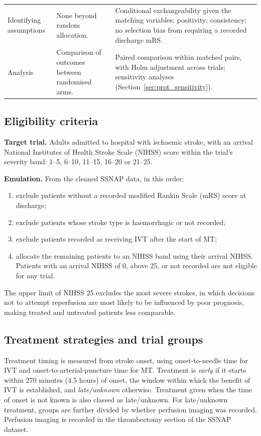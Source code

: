 \begin{table}[H]
\begin{tabular}{p{2.8cm} p{6.6cm} p{6.6cm}}
\addlinespace
Identifying assumptions & None beyond random allocation. & Conditional exchangeability given the matching variables; positivity; consistency; no selection bias from requiring a recorded discharge mRS. \\
\addlinespace
Analysis & Comparison of outcomes between randomised arms. & Paired comparison within matched pairs, with Holm adjustment across trials; sensitivity analyses (Section~\ref{sec:prot_sensitivity}). \\
\bottomrule
\end{tabular}
\end{table}

\subsection{Eligibility criteria}

\textbf{Target trial.} Adults admitted to hospital with ischaemic stroke, with an arrival National Institutes of Health Stroke Scale (NIHSS)\cite{brott_measurements_1989} score within the trial's severity band: 1--5, 6--10, 11--15, 16--20 or 21--25.

\textbf{Emulation.} From the cleaned SSNAP data, in this order:
\begin{enumerate}
\item exclude patients without a recorded modified Rankin Scale (mRS) score at discharge;
\item exclude patients whose stroke type is haemorrhagic or not recorded;
\item exclude patients recorded as receiving IVT after the start of MT;
\item allocate the remaining patients to an NIHSS band using their arrival NIHSS. Patients with an arrival NIHSS of 0, above 25, or not recorded are not eligible for any trial.
\end{enumerate}
The upper limit of NIHSS 25 excludes the most severe strokes, in which decisions not to attempt reperfusion are most likely to be influenced by poor prognosis, making treated and untreated patients less comparable.

\subsection{Treatment strategies and trial groups}

Treatment timing is measured from stroke onset, using onset-to-needle time for IVT and onset-to-arterial-puncture time for MT. Treatment is \textit{early} if it starts within 270 minutes (4.5 hours) of onset, the window within which the benefit of IVT is established\cite{emberson_effect_2014}, and \textit{late/unknown} otherwise. Treatment given when the time of onset is not known is also classed as late/unknown. For late/unknown treatment, groups are further divided by whether perfusion imaging was recorded. Perfusion imaging is recorded in the thrombectomy section of the SSNAP dataset.

